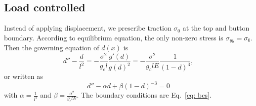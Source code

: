 \documentclass[10pt,onecolumn]{article}
\begin{document}
\subsection{Load controlled}
Instead of applying displacement, we prescribe traction $\sigma_0$ at the top and button boundary. According to equilibrium equation, the only non-zero stress is $\sigma_{yy} = \sigma_0$. Then the governing equation of $d(x)$ is
\begin{equation}
	d''-\frac{d}{l^2} = -\frac{\sigma^2}{g_cl}\frac{g'(d)}{g(d)^2} = -\frac{\sigma^2}{g_clE}\frac{1}{(1-d)^3},
\end{equation}
or written as
\begin{equation}
	d''-\alpha d + \beta (1-d)^{-3} = 0
\end{equation}
with $\alpha=\frac{1}{l^2}$ and $\beta = \frac{\sigma^2}{g_clE}$. The boundary conditions are Eq.~\ref{eq: bcs}.


\newpage


\end{document}
